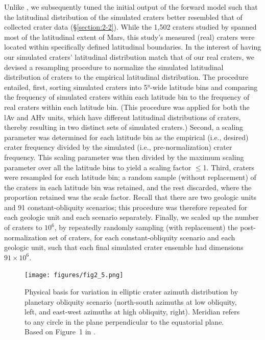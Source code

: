 \documentclass{ucetd}
\begin{document}
Unlike \citet{holo2018a}, we subsequently tuned the initial output of the forward model such that the latitudinal distribution of the simulated craters better resembled that of collected crater data (§\ref{section:2-2}). While the 1,502 craters studied by \citet{holo2018a} spanned most of the latitudinal extent of Mars, this study’s measured (real) craters were located within specifically defined latitudinal boundaries. In the interest of having our simulated craters’ latitudinal distribution match that of our real craters, we devised a resampling procedure to normalize the simulated latitudinal distribution of craters to the empirical latitudinal distribution. The procedure entailed, first, sorting simulated craters into 5°-wide latitude bins and comparing the frequency of simulated craters within each latitude bin to the frequency of real craters within each latitude bin. (This procedure was applied for both the lAv and AHv units, which have different latitudinal distributions of craters, thereby resulting in two distinct sets of simulated craters.) Second, a scaling parameter was determined for each latitude bin as the empirical (i.e., desired) crater frequency divided by the simulated (i.e., pre-normalization) crater frequency. This scaling parameter was then divided by the maximum scaling parameter over all the latitude bins to yield a scaling factor $\le$1. Third, craters were resampled for each latitude bin; a random sample (without replacement) of the craters in each latitude bin was retained, and the rest discarded, where the proportion retained was the scale factor. Recall that there are two geologic units and 91 constant-obliquity scenarios; this procedure was therefore repeated for each geologic unit and each scenario separately. Finally, we scaled up the number of craters to $10^6$, by repeatedly randomly sampling (with replacement) the post-normalization set of craters, for each constant-obliquity scenario and each geologic unit, such that each final simulated crater ensemble had dimensions $91\times10^6$.

\begin{figure}
    \centering
    \texttt{[image: figures/fig2\_5.png]}
    \caption[Physical basis for variation in elliptic crater azimuth distribution]{Physical basis for variation in elliptic crater azimuth distribution by planetary obliquity scenario (north-south azimuths at low obliquity, left, and east-west azimuths at high obliquity, right). Meridian refers to any circle in the plane perpendicular to the equatorial plane. Based on Figure~1 in \citet{holo2018a}.}
    \label{fig:2-5}
\end{figure}
\end{document}
